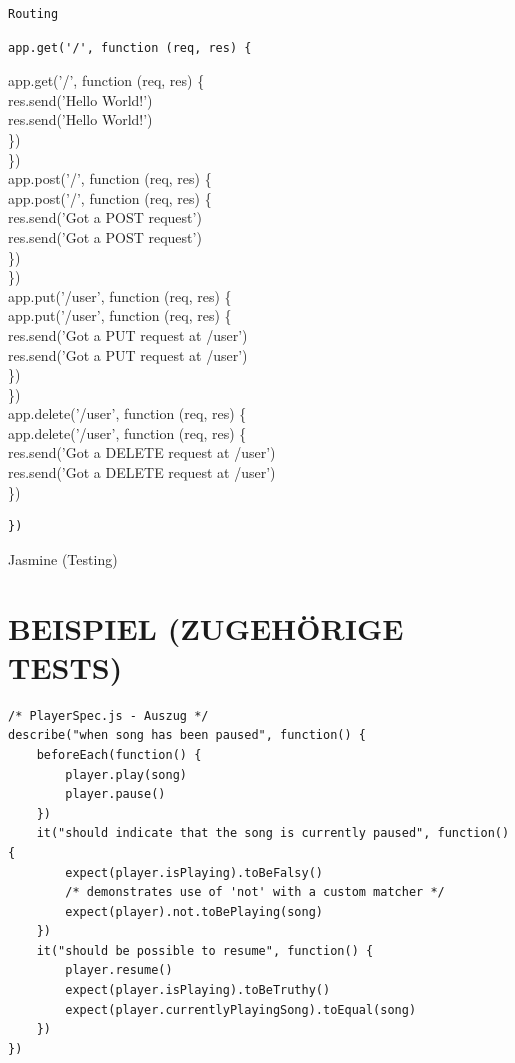 \begin{verbatim}
Routing
\end{verbatim}

\begin{verbatim}
app.get('/', function (req, res) {
\end{verbatim}

app.get('/', function (req, res) \{\\
res.send('Hello World!')\\
res.send('Hello World!')\\
\})\\
\})\\
app.post('/', function (req, res) \{\\
app.post('/', function (req, res) \{\\
res.send('Got a POST request')\\
res.send('Got a POST request')\\
\})\\
\})\\
app.put('/user', function (req, res) \{\\
app.put('/user', function (req, res) \{\\
res.send('Got a PUT request at /user')\\
res.send('Got a PUT request at /user')\\
\})\\
\})\\
app.delete('/user', function (req, res) \{\\
app.delete('/user', function (req, res) \{\\
res.send('Got a DELETE request at /user')\\
res.send('Got a DELETE request at /user')\\
\})

\begin{verbatim}
})
\end{verbatim}

Jasmine (Testing)

\section*{BEISPIEL (ZUGEHÖRIGE TESTS)}
\begin{verbatim}
/* PlayerSpec.js - Auszug */
describe("when song has been paused", function() {
    beforeEach(function() {
        player.play(song)
        player.pause()
    })
    it("should indicate that the song is currently paused", function() {
        expect(player.isPlaying).toBeFalsy()
        /* demonstrates use of 'not' with a custom matcher */
        expect(player).not.toBePlaying(song)
    })
    it("should be possible to resume", function() {
        player.resume()
        expect(player.isPlaying).toBeTruthy()
        expect(player.currentlyPlayingSong).toEqual(song)
    })
})
\end{verbatim}

